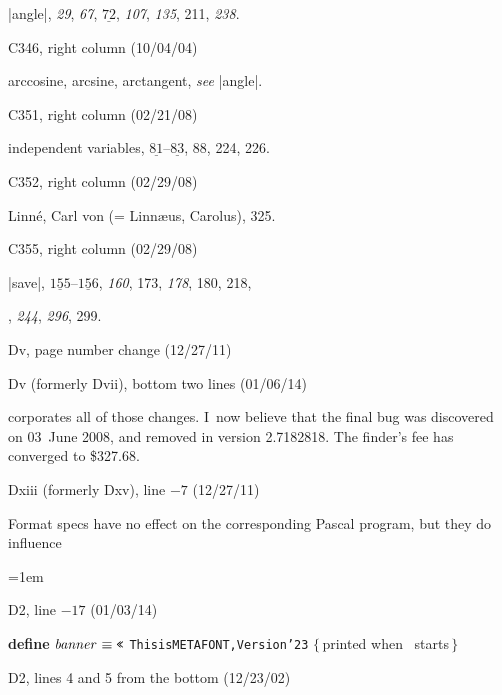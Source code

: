 {{\eightpoint\noindent
\llap{*}|angle|, {\it29}, {\it67}, $\underline{72}$, {\it107},
{\it135}, 211, {\it238}.

\bugonpage C346, right column (10/04/04)

\eightpoint\noindent
arccosine, arcsine, arctangent, {\sl see\/} |angle|.

\bugonpage C351, right column (02/21/08)

\eightpoint\noindent
independent variables, $\underline{81}$--$\underline{83}$, 88, 224, 226.

\bugonpage C352, right column (02/29/08)

\eightpoint\noindent
Linn\'e, Carl von (= Linn\ae us, Carolus), 325.

\bugonpage C355, right column (02/29/08)

\eightpoint\noindent
\llap{*}|save|, $\underline{155}$--$\underline{156}$, {\it160}, 173,
  {\it178}, 180, 218,\par
\noindent{}, {\it244}, {\it296}, 299.

\def\\#1{\hbox{\it#1\/\kern.05em}} %
\def\to{\mathrel{.\,.}} %

\bugonpage Dv, page number change (12/27/11)

\eightpoint{}

\bugonpage Dv {(formerly Dvii)}, bottom two lines (01/06/14)

\eightpoint\noindent
corporates all of those changes.
I~now believe that the final bug was discovered on 03~June 2008,
and removed in version 2.7182818.
The finder's fee has converged to \$327.68.

\bugonpage Dxiii {(formerly Dxv)}, line $-7$ (12/27/11)

\ninepoint\noindent
Format specs have no effect on the corresponding Pascal program, but they
do influence\cutpar

\hsize=35pc
\parindent=1em

\bugonpage D2, line $-17$ (01/03/14)

\ninepoint\noindent
{\bf define} $\\{banner}\equiv\hbox{\tt\char'23}$%
{\tt This\]is\]METAFONT,\]Version\char'23}\quad
$\{\,$printed when \MF\ starts$\,\}$

\bugonpage D2, lines 4 and 5 from the bottom (12/23/02)

}}
